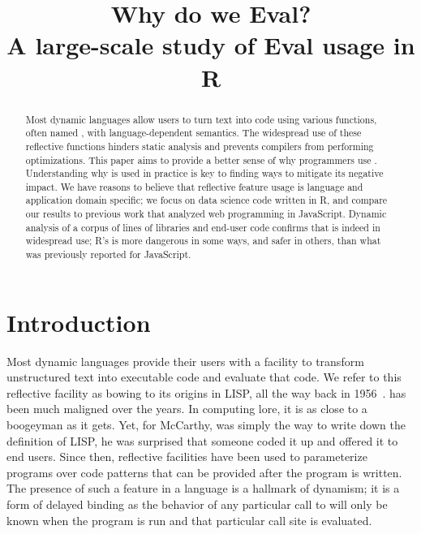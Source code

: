 \documentclass[USenglish,cleveref, autoref, thm-restate]{lipics-v2019}
\title{Why do we Eval?\\[2mm]\Large A large-scale study of Eval usage in R}
\begin{document}
\maketitle

\begin{abstract}
  \noindent Most dynamic languages allow users to turn text into code
  using various functions, often named \eval, with language-dependent
  semantics. The widespread use of these reflective functions hinders
  static analysis and prevents compilers from performing
  optimizations. This paper aims to provide a better sense of why
  programmers use \eval. Understanding why \eval is used in practice
  is key to finding ways to mitigate its negative impact. We have
  reasons to believe that reflective feature usage is language and
  application domain specific; we focus on data science code written
  in R, and compare our results to previous work that analyzed web
  programming in JavaScript. Dynamic analysis of a corpus of
  \CorpusAllCodeRnd lines of libraries and end-user code confirms that
  \eval is indeed in widespread use; R's \eval is more dangerous in
  some ways, and safer in others, than what was previously reported
  for JavaScript.
\end{abstract}


\section{Introduction}

Most dynamic languages provide their users with a facility to
transform unstructured text into executable code and evaluate that
code. We refer to this reflective facility as \eval bowing to its
origins in LISP, all the way back in 1956~\cite{lisp}. \Eval has been
much maligned over the years. In computing lore, it is as close to a
boogeyman as it gets. Yet, for McCarthy, \eval was simply the way to
write down the definition of LISP, he was surprised that someone coded
it up and offered it to end users. Since then, reflective facilities
have been used to parameterize programs over code patterns that can be
provided after the program is written. The presence of such a feature
in a language is a hallmark of dynamism; it is a form of delayed
binding as the behavior of any particular call to \eval will only be
known when the program is run and that particular call site is
evaluated.
\end{document}
